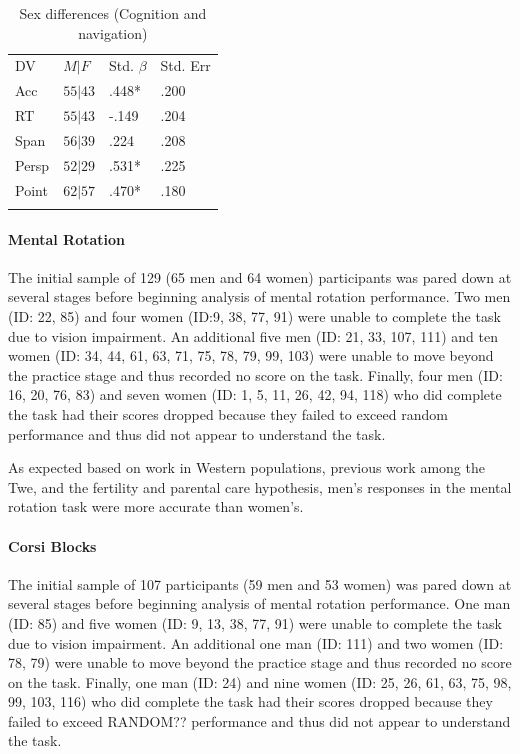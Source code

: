 \begin{table}
\caption{Sex differences (Cognition and navigation)}
\label{tab:sd_cog}  
\begin{tabular}{llll}
\hline\noalign{\smallskip}
DV & $M|F$ & Std. $\beta$ & Std. Err  \\
\noalign{\smallskip}\hline\noalign{\smallskip}
Acc & $55|43$ & .448* & .200 \\
RT & $55|43$ & -.149 & .204 \\
Span & $56|39$ & .224 & .208 \\
Persp & $52|29$ & .531* & .225 \\
Point & $62|57$ & .470* & .180 \\
\noalign{\smallskip}\hline
\end{tabular}
\end{table}

\paragraph{Mental Rotation}
The initial sample of 129 (65 men and 64 women) participants was pared down at several stages before beginning analysis of mental rotation performance.  Two men (ID: 22, 85) and four women (ID:9, 38, 77, 91) were unable to complete the task due to vision impairment.  An additional five men (ID: 21, 33, 107, 111) and ten women (ID: 34, 44, 61, 63, 71, 75, 78, 79, 99, 103) were unable to move beyond the practice stage and thus recorded no score on the task.  Finally, four men (ID: 16, 20, 76, 83) and seven women (ID: 1, 5, 11, 26, 42, 94, 118) who did complete the task had their scores dropped because they failed to exceed random performance and thus did not appear to understand the task.

As expected based on work in Western populations, previous work among the Twe, and the fertility and parental care hypothesis, men's responses in the mental rotation task were more accurate than women's.

\paragraph{Corsi Blocks}
The initial sample of 107 participants (59 men and 53 women) was pared down at several stages before beginning analysis of mental rotation performance.  One man (ID: 85) and five women (ID: 9, 13, 38, 77, 91) were unable to complete the task due to vision impairment.  An additional one man (ID: 111) and two women (ID: 78, 79) were unable to move beyond the practice stage and thus recorded no score on the task.  Finally, one man (ID: 24) and nine women (ID: 25, 26, 61, 63, 75, 98, 99, 103, 116) who did complete the task had their scores dropped because they failed to exceed RANDOM?? performance and thus did not appear to understand the task.  

